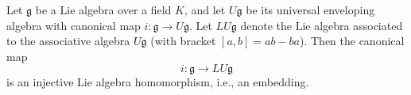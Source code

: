 Let $\mathfrak{g}$ be a Lie algebra over a field $K$, and let $U\mathfrak{g}$ be its universal enveloping algebra with canonical map $i : \mathfrak{g} \to U\mathfrak{g}$. Let $LU\mathfrak{g}$ denote the Lie algebra associated to the associative algebra $U\mathfrak{g}$ (with bracket $[a, b] = ab - ba$). Then the canonical map
$$
i : \mathfrak{g} \longrightarrow LU\mathfrak{g}
$$
is an injective Lie algebra homomorphism, i.e., an embedding.
